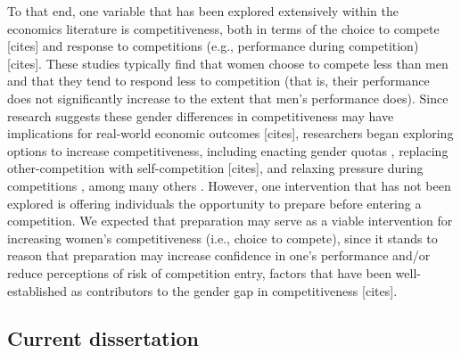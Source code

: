 \documentclass[a4paper,nobind]{templates/ociamthesis}
\begin{document}
To that end, one variable that has been explored extensively within the economics literature is competitiveness, both in terms of the choice to compete {[}cites{]} and response to competitions (e.g., performance during competition) {[}cites{]}. These studies typically find that women choose to compete less than men and that they tend to respond less to competition (that is, their performance does not significantly increase to the extent that men's performance does). Since research suggests these gender differences in competitiveness may have implications for real-world economic outcomes {[}cites{]}, researchers began exploring options to increase competitiveness, including enacting gender quotas \autocite{Niederle2013,Sutter2016}, replacing other-competition with self-competition {[}cites{]}, and relaxing pressure during competitions \autocite{Shurchkov2012}, among many others \autocite[see][ for a review]{Niederle2017b}. However, one intervention that has not been explored is offering individuals the opportunity to prepare before entering a competition. We expected that preparation may serve as a viable intervention for increasing women's competitiveness (i.e., choice to compete), since it stands to reason that preparation may increase confidence in one's performance and/or reduce perceptions of risk of competition entry, factors that have been well-established as contributors to the gender gap in competitiveness {[}cites{]}.

\hypertarget{current-dissertation}{%
\subsection{Current dissertation}\label{current-dissertation}}
\end{document}
